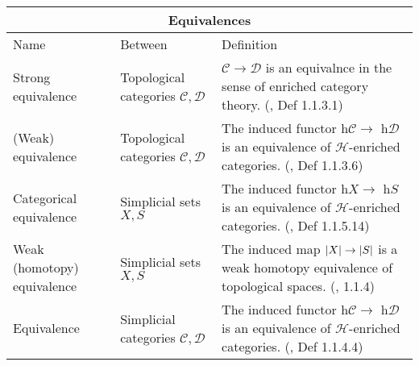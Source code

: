 \documentclass{article}
\begin{document}
\centering
\begin{tabular}{ |p{5cm}||p{5cm}|p{7cm}|}
 \hline
 \multicolumn{3}{|c|}{Equivalences}\\
 \hline
 Name& Between & Definition\\
  \hline\hline
    Strong equivalence & Topological categories \(\mathcal{C}, \mathcal{D}\) & \(\mathcal{C} \to \mathcal{D}\) is an equivalnce in the sense of enriched category theory. (\autocite{htt}, Def 1.1.3.1)\\
 \hline
  (Weak) equivalence & Topological categories \(\mathcal{C}, \mathcal{D}\) & The induced functor h\(\mathcal{C} \to\) h\(\mathcal{D}\) is an equivalence of \(\mathcal{H}\)-enriched categories. (\autocite{htt}, Def 1.1.3.6)\\
  \hline
  Categorical equivalence & Simplicial sets \(X, S\) & The induced functor h\(X \to\) h\(S\) is an equivalence of \(\mathcal{H}\)-enriched categories. (\autocite{htt}, Def 1.1.5.14)\\
\hline 
 Weak (homotopy) equivalence & Simplicial sets \(X, S\) & The induced map \(\lvert X\rvert \to \lvert S\rvert\) is a weak homotopy equivalence of topological spaces. (\autocite{htt}, 1.1.4)\\
 \hline
 Equivalence & Simplicial categories \(\mathcal{C}, \mathcal{D}\) &The induced functor h\(\mathcal{C} \to\) h\(\mathcal{D}\) is an equivalence of \(\mathcal{H}\)-enriched categories. (\autocite{htt}, Def 1.1.4.4)\\
\hline
\end{tabular}

\text{}

\text{}
\end{document}
